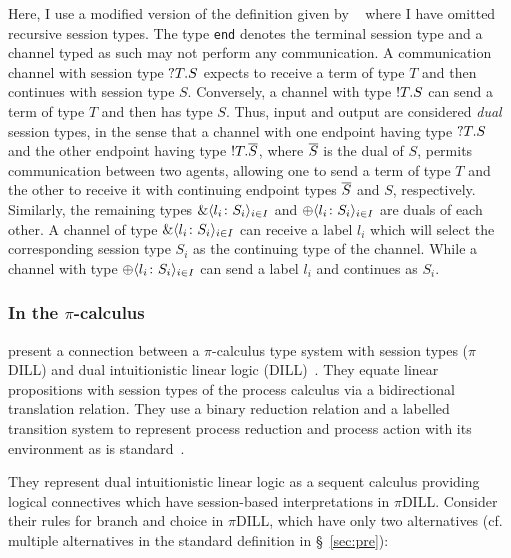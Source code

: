 \documentclass{mpaper}
\begin{document}
Here, I use a modified version of the definition given by
\citeauthor{Gay:2010:LAST}~\cite{Gay:2010:LAST} where I have omitted recursive
session types. The type \lstinline{end} denotes the terminal session type and
a channel typed as such may not perform any communication. A communication
channel with session type $?{T}.{S}$ expects to receive a term of type $T$
and then continues with session type $S$. Conversely, a channel with type
$!{T}.{S}$ can send a term of type $T$ and then has type $S$. Thus, input
and output are considered \emph{dual} session types, in the sense that a
channel with one endpoint having type $?{T}.{S}$ and the other endpoint
having type $!{T}.{\overline{{S}}}$, where $\overline{{S}}$ is the dual of $S$,
permits communication between two agents, allowing one to send a term of type
$T$ and the other to receive it with continuing endpoint types $\overline{{S}}$ and
$S$, respectively. Similarly, the remaining types $\&\langle{l_i}\colon{S_i}\rangle_{i\in I}$
and $\oplus\langle{l_i}\colon{S_i}\rangle_{i\in I}$ are duals of each other. A channel of type
$\&\langle{l_i}\colon{S_i}\rangle_{i\in I}$ can receive a label $l_i$ which will select the
corresponding session type $S_i$ as the continuing type of the channel. While
a channel with type $\oplus\langle{l_i}\colon{S_i}\rangle_{i\in I}$ can send a label $l_i$ and
continues as $S_i$.

\subsubsection{In the \texorpdfstring{$\pi$}{pi}-calculus}\label{sec:pis}

\citeauthor{Caires:2010:STI} \cite{Caires:2010:STI} present a connection
between a $\pi$-calculus type system with session types ($\pi$DILL) and dual
intuitionistic linear logic (DILL)~\cite{Barber:1996}. They equate linear
propositions with session types of the process calculus via a bidirectional
translation relation. They use a binary reduction relation and a labelled
transition system to represent process reduction and process action with its
environment as is standard~\cite{Sangiorgi:2001}.

They represent dual intuitionistic linear logic as a sequent calculus
providing logical connectives which have session-based interpretations in
$\pi$DILL. Consider their rules for branch and choice in $\pi$DILL, which have
only two alternatives (cf. multiple alternatives in the standard definition in
\S~\ref{sec:pre}):

\end{document}
